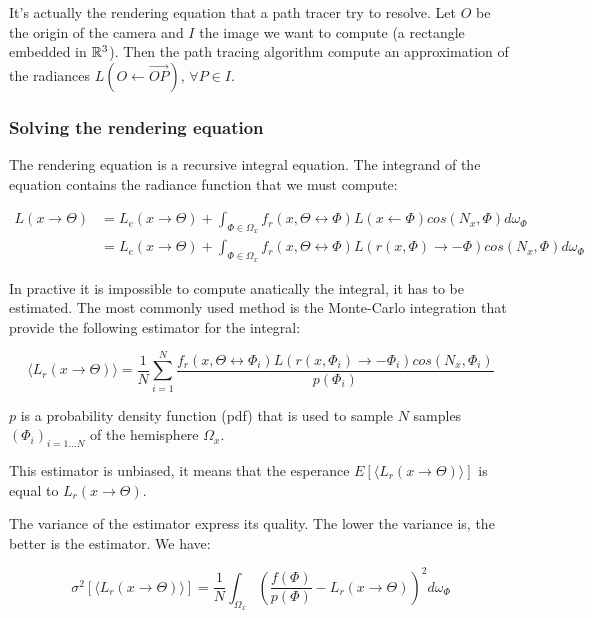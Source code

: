 It's actually the rendering equation that a path tracer try to resolve. Let $O$ be the origin of the camera and $I$ the image we want to compute (a rectangle embedded in $\mathbb{R}^3$). Then the path tracing algorithm compute an approximation of the radiances $L(O \leftarrow \vec{OP})$, $\forall P \in I$.

\subsubsection{Solving the rendering equation}

The rendering equation is a recursive integral equation. The integrand of the equation contains the radiance function that we must compute:

\begin{align*}
L(x \rightarrow \Theta) &= L_e(x \rightarrow \Theta) + \int_{\Phi \in \Omega_x} f_r(x, \Theta \leftrightarrow \Phi) L(x \leftarrow \Phi) cos(N_x, \Phi) d\omega_\Phi \\
&= L_e(x \rightarrow \Theta) + \int_{\Phi \in \Omega_x} f_r(x, \Theta \leftrightarrow \Phi) L(r(x, \Phi) \rightarrow -\Phi) cos(N_x, \Phi) d\omega_\Phi
\end{align*}

In practive it is impossible to compute anatically the integral, it has to be estimated. The most commonly used method is the Monte-Carlo integration that provide the following estimator for the integral:

\begin{equation*}
\langle L_r(x \rightarrow \Theta) \rangle = \frac{1}{N} \sum_{i = 1}^{N} \frac{f_r(x, \Theta \leftrightarrow \Phi_i) L(r(x, \Phi_i) \rightarrow -\Phi_i) cos(N_x, \Phi_i)}{p(\Phi_i)}
\end{equation*}

$p$ is a probability density function (pdf) that is used to sample $N$ samples $(\Phi_i)_{i = 1...N}$ of the hemisphere $\Omega_x$.

This estimator is unbiased, it means that the esperance $E[\langle L_r(x \rightarrow \Theta) \rangle]$ is equal to $L_r(x \rightarrow \Theta)$. 

The variance of the estimator express its quality. The lower the variance is, the better is the estimator. We have:

\begin{equation*}
\sigma^2[\langle L_r(x \rightarrow \Theta) \rangle] = \frac{1}{N} \int_{\Omega_x} (\frac{f(\Phi)}{p(\Phi)} - L_r(x \rightarrow \Theta))^2 d\omega_\Phi
\end{equation*}

